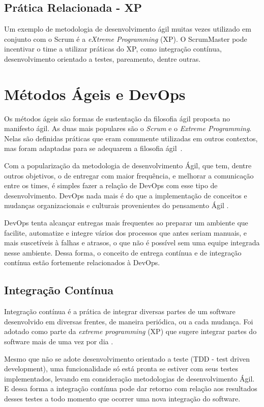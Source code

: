 \subsection{Prática Relacionada - XP}

Um exemplo de metodologia de desenvolvimento ágil muitas vezes utilizado em
conjunto com o Scrum é a \textit{eXtreme Programming} (XP). O ScrumMaster pode
incentivar o time a utilizar práticas do XP, como integração contínua, 
desenvolvimento orientado a testes, pareamento, dentre outras.

\section{Métodos Ágeis e DevOps}

Os métodos ágeis são formas de sustentação da filosofia ágil proposta no manifesto
ágil. As duas mais populares são o \textit{Scrum} e o \textit{Extreme Programming}. Nelas
são definidas práticas que eram comumente utilizadas em outros contextos,
mas foram adaptadas para se adequarem a filosofia ágil~\cite{shore:2007}.

Com a popularização da metodologia de desenvolvimento Ágil, que tem, dentre outros
objetivos, o de entregar com maior frequência, e melhorar a comunicação entre os
times, é simples fazer a relação de DevOps com esse tipo de desenvolvimento.
DevOps nada mais é do que a implementação de conceitos e mudanças organizacionais
e culturais provenientes do pensamento Ágil \cite{scott2014}.

DevOps tenta alcançar entregas mais frequentes ao preparar um ambiente que facilite,
automatize e integre vários dos processos que antes seriam manuais, e mais
suscetíveis à falhas e atrasos, o que não é possível sem uma equipe integrada
nesse ambiente. Dessa forma, o conceito de entrega contínua e de integração
contínua estão fortemente relacionados à DevOps.~\cite{adambertram:2016}

\subsection{Integração Contínua}

Integração contínua é a prática de integrar diversas partes de um software
desenvolvido em diversas frentes, de maneira periódica, ou a cada mudança.
Foi adotado como parte da \textit{extreme programming} (XP) que sugere integrar
partes do software mais de uma vez por dia \cite{fowler2006continuous}.

Mesmo que não se adote desenvolvimento orientado a teste (TDD - test driven 
development), uma funcionalidade só está pronta se estiver com seus testes 
implementados, levando em consideração metodologias de desenvolvimento Ágil. 
E dessa forma a integração contínua pode dar retorno com relação aos resultados
desses testes a todo momento que ocorrer uma nova integração do software.

